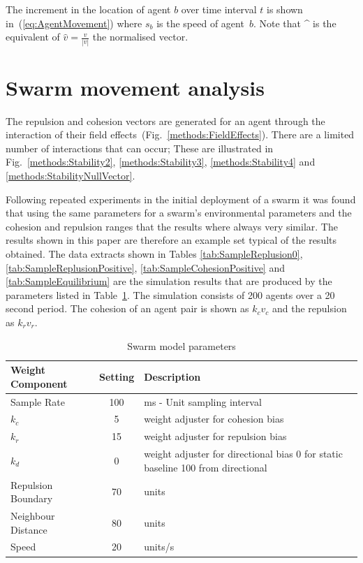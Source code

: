 \documentclass{ieeeaccess}
\begin{document}
The increment in the location of agent $b$ over time interval $t$ is shown in~(\ref{eq:AgentMovement}) where $s_b$ is the speed of agent~$b$. Note that \string^ is the equivalent of $\hat{v} = \frac{v}{|v|}$ the normalised vector.

\section{Swarm movement analysis\label{metric:MagnitudeDynamics2}}
The repulsion and cohesion vectors are generated for an agent through the interaction of their field effects~(Fig.~\ref{methods:FieldEffects}). There are a limited number of interactions that can occur; These are illustrated in Fig.~\ref{methods:Stability2}, \ref{methods:Stability3}, \ref{methods:Stability4} and \ref{methods:StabilityNullVector}.

Following repeated experiments in the initial deployment of a swarm it was found that using the same parameters for a swarm's environmental parameters and the cohesion and repulsion ranges that the results where always very similar. The results shown in this paper are therefore an example set typical of the results obtained. The data extracts shown in Tables \ref{tab:SampleReplusion0}, \ref{tab:SampleReplusionPositive}, \ref{tab:SampleCohesionPositive} and  \ref{tab:SampleEquilibrium} are the simulation results that are produced by the parameters listed in Table~\ref{tab:MetricPhysics1}. The simulation consists of 200 agents over a 20 second period. The cohesion of an agent pair is shown as $k_cv_c$ and the repulsion as $k_rv_r$.

\begin{table}[H]
\begin{center}
\begin{tabular}{| p{2.5cm} | c | p{3cm} |}
\hline
\bf Weight \bf Component & \bf Setting & \bf Description \\ \hline
Sample Rate & 100 & ms - Unit sampling interval\\  \hline
$k_c$ & 5 & weight adjuster for cohesion bias\\  \hline
$k_r$ & 15 & weight adjuster for repulsion  bias\\  \hline
$k_d$ & 0 & weight adjuster for directional bias 0 for static baseline 100 from directional\\  \hline
Repulsion Boundary & 70 & units\\  \hline
Neighbour Distance & 80 & units\\  \hline
Speed & 20 & units/s\\  \hline
\end{tabular}\caption{Swarm model parameters} \label{tab:MetricPhysics1}
\end{center}
\end{table}
\end{document}
